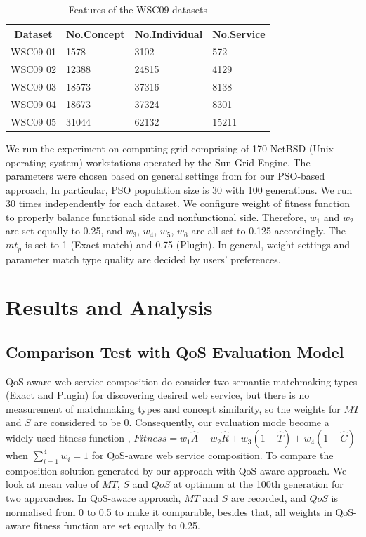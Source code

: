 \documentclass{IEEEtran}
\begin{document}
\begin{table}[]
\centering
\caption{Features of the WSC09 datasets}
\label{wsc09datasetTable}
\begin{tabular}{l|l|l|l}
\hline
\multicolumn{1}{c|}{Dataset} & No.Concept & No.Individual & No.Service \\ \hline
WSC09 01                     & 1578       &3102           &572      \\ \hline
WSC09 02                     & 12388      &24815          &4129      \\ \hline
WSC09 03                     & 18573      &37316          &8138      \\ \hline
WSC09 04                     & 18673      &37324          &8301      \\ \hline
WSC09 05                     & 31044      &62132          &15211    \\ \hline
\end{tabular}
\end{table}

We run the experiment on computing grid comprising of 170 NetBSD (Unix operating system) workstations operated by the Sun Grid Engine. The parameters were chosen based on general settings from \cite{shi2001particle} for our PSO-based approach, In particular, PSO population size is 30 with 100 generations. We run 30 times independently for each dataset. We configure weight of fitness function to properly balance functional side and nonfunctional side. Therefore, $w_{1}$ and $w_{2}$ are set equally to 0.25, and $w_{3}$, $w_{4}$, $w_{5}$, $w_{6}$ are all set to 0.125 accordingly. The $mt_{p}$ is set to 1 (Exact match) and 0.75 (Plugin). In general, weight settings and parameter match type quality are decided by users' preferences.


\section{Results and Analysis}\label{results_analysis}
\subsection{Comparison Test with QoS Evaluation Model}\label{comparisonTest}
QoS-aware web service composition \cite{da2016particle,da2015graphevol,yu2013adaptive,ma2015hybrid} do consider two semantic matchmaking types (Exact and Plugin) for discovering desired web service, but there is no measurement of matchmaking types and concept similarity, so the weights for $MT$ and $S$ are considered to be 0. Consequently, our evaluation mode become a widely used fitness function \cite{ma2015hybrid, da2016particle}, $Fitness = w_1 \hat{A} + w_2 \hat{R} + w_3(1 - \hat{T}) + w_4(1 - \hat{C})$ when $\sum_{i=1}^{4} w_i = 1$  for QoS-aware web service composition. To compare the composition solution generated by our approach with QoS-aware approach. We look at mean value of $MT$, $S$ and $QoS$ at optimum at the 100th generation for two approaches. In QoS-aware approach, $MT$ and $S$ are recorded, and $QoS$ is normalised from 0 to 0.5 to make it comparable, besides that, all weights in QoS-aware fitness function are set equally to 0.25.
\end{document}

